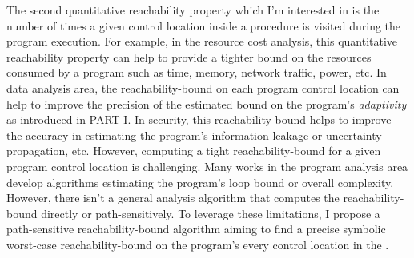 The second quantitative reachability property which I'm interested in is 
the number of times a given control location 
 inside a procedure is visited during the program execution.
For example, in the resource cost analysis, this quantitative reachability property
can help to provide a tighter
bound on the resources consumed by a program such as time, memory,
network traffic, power, etc.
In data analysis area,
the reachability-bound on each program control location
can help to improve the precision of the estimated bound on the program's \emph{adaptivity} as introduced in PART I.
In security, this reachability-bound helps to improve the accuracy
in estimating the program's information leakage or uncertainty propagation, etc.
However, computing a tight reachability-bound for a given program control location is challenging.
Many works in the program analysis area develop algorithms estimating the program's loop bound or overall complexity.
However, there isn't a general analysis algorithm that
computes the reachability-bound
directly or path-sensitively.
To leverage these limitations,
I propose a path-sensitive reachability-bound algorithm
aiming to find a precise symbolic worst-case reachability-bound on the program's every control location
in the .

